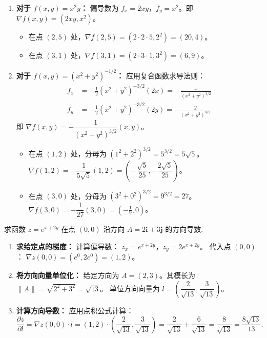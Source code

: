 \documentclass[lang=cn,11pt]{elegantbook}
\begin{document}
\begin{solution}
\begin{enumerate}
  \item[(1)] \textbf{对于 $f(x,y)=x^2y$：}
  偏导数为 $f_x = 2xy$，$f_y = x^2$。即 $\nabla f(x,y) = (2xy, x^2)$。
  \begin{itemize}
    \item 在点 $(2,5)$ 处，$\nabla f(2,5) = (2\cdot 2\cdot 5, 2^2) = (20, 4)$。
    \item 在点 $(3,1)$ 处，$\nabla f(3,1) = (2\cdot 3\cdot 1, 3^2) = (6, 9)$。
  \end{itemize}

  \item[(2)] \textbf{对于 $f(x,y)=(x^2+y^2)^{-1/2}$：}
  应用复合函数求导法则：
  \begin{align*}
  f_x &= -\frac{1}{2}(x^2+y^2)^{-3/2}(2x) = -\frac{x}{(x^2+y^2)^{3/2}} \\
  f_y &= -\frac{1}{2}(x^2+y^2)^{-3/2}(2y) = -\frac{y}{(x^2+y^2)^{3/2}}
  \end{align*}
  即 $\nabla f(x,y) = -\dfrac{1}{(x^2+y^2)^{3/2}}(x,y)$。
  \begin{itemize}
    \item 在点 $(1,2)$ 处，分母为 $(1^2+2^2)^{3/2} = 5^{3/2} = 5\sqrt{5}$。
          $\nabla f(1,2) = -\dfrac{1}{5\sqrt{5}}(1, 2) = \left(-\dfrac{\sqrt{5}}{25}, -\dfrac{2\sqrt{5}}{25}\right)$。
    \item 在点 $(3,0)$ 处，分母为 $(3^2+0^2)^{3/2} = 9^{3/2} = 27$。
          $\nabla f(3,0) = -\dfrac{1}{27}(3, 0) = \left(-\frac{1}{9}, 0\right)$。
  \end{itemize}
\end{enumerate}
\end{solution}

\begin{exercise}[指定向量方向上的方向导数]
求函数 $z=e^{x+2y}$ 在点 $(0,0)$ 沿方向 $A=2\boldsymbol{i}+3\boldsymbol{j}$ 的方向导数.
\end{exercise}

\begin{solution}
\begin{enumerate}
  \item \textbf{求给定点的梯度：}
  计算偏导数：
  $z_x = e^{x+2y}$，$z_y = 2e^{x+2y}$。
  代入点 $(0,0)$：
  $\nabla z(0,0) = (e^0, 2e^0) = (1, 2)$。

  \item \textbf{将方向向量单位化：}
  给定方向为 $A = (2, 3)$。其模长为 $\|A\| = \sqrt{2^2+3^2} = \sqrt{13}$。
  单位方向向量为 $l = \left(\dfrac{2}{\sqrt{13}}, \dfrac{3}{\sqrt{13}}\right)$。

  \item \textbf{计算方向导数：}
  应用点积公式计算：
  \[
  \frac{\partial z}{\partial l} = \nabla z(0,0) \cdot l = (1, 2) \cdot \left(\frac{2}{\sqrt{13}}, \frac{3}{\sqrt{13}}\right) = \frac{2}{\sqrt{13}} + \frac{6}{\sqrt{13}} = \frac{8}{\sqrt{13}} = \frac{8\sqrt{13}}{13}.
  \]
\end{enumerate}
\end{solution}
\end{document}
